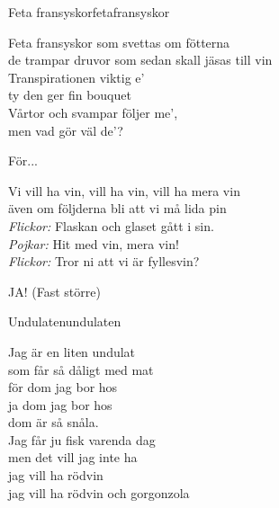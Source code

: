 \newpage

\begin{song}{Feta fransyskor}{fetafransyskor}
\begin{vers}
Feta fransyskor som svettas om fötterna\\
de trampar druvor som sedan skall jäsas till vin\\
Transpirationen viktig e'\\
ty den ger fin bouquet\\
Vårtor och svampar följer me',\\
men vad gör väl de'?\\
\end{vers}
\begin{vers}
För...\\
\end{vers}
\begin{vers}
Vi vill ha vin, vill ha vin, vill ha mera vin\\
även om följderna bli att vi må lida pin\\
\textit{Flickor:}   Flaskan och glaset gått i sin.\\
\textit{Pojkar:}    Hit med vin, mera vin!\\
\textit{Flickor:}   Tror ni att vi är fyllesvin?\\
\end{vers}
\begin{vers}
JA! (Fast större)\\
\end{vers}
\end{song}

\newpage

\begin{song}{Undulaten}{undulaten}

\begin{vers}
Jag är en liten undulat\\
som får så dåligt med mat\\
för dom jag bor hos\\
ja dom jag bor hos\\
dom är så snåla.\\
Jag får ju fisk varenda dag\\
men det vill jag inte ha\\
jag vill ha rödvin\\
jag vill ha rödvin och gorgonzola\\
\end{vers}
\end{song}


